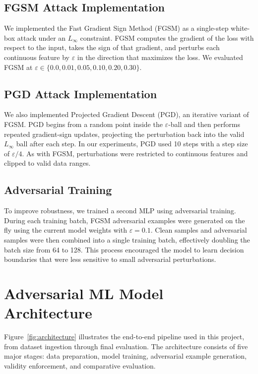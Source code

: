 \documentclass[11pt]{article}
\begin{document}
\subsection{FGSM Attack Implementation}

We implemented the Fast Gradient Sign Method (FGSM) as a single-step white-box attack under an $L_{\infty}$ constraint. FGSM computes the gradient of the loss with respect to the input, takes the sign of that gradient, and perturbs each continuous feature by $\varepsilon$ in the direction that maximizes the loss. We evaluated FGSM at $\varepsilon \in \{0.0, 0.01, 0.05, 0.10, 0.20, 0.30\}$.

\subsection{PGD Attack Implementation}

We also implemented Projected Gradient Descent (PGD), an iterative variant of FGSM. PGD begins from a random point inside the $\varepsilon$-ball and then performs repeated gradient-sign updates, projecting the perturbation back into the valid $L_{\infty}$ ball after each step. In our experiments, PGD used 10 steps with a step size of $\varepsilon / 4$. As with FGSM, perturbations were restricted to continuous features and clipped to valid data ranges.

\subsection{Adversarial Training}

To improve robustness, we trained a second MLP using adversarial training. During each training batch, FGSM adversarial examples were generated on the fly using the current model weights with $\varepsilon = 0.1$. Clean samples and adversarial samples were then combined into a single training batch, effectively doubling the batch size from 64 to 128. This process encouraged the model to learn decision boundaries that were less sensitive to small adversarial perturbations.

\section{Adversarial ML Model Architecture}

Figure~\ref{fig:architecture} illustrates the end-to-end pipeline used in this project, from dataset ingestion through final evaluation. The architecture consists of five major stages: data preparation, model training, adversarial example generation, validity enforcement, and comparative evaluation.
\end{document}
